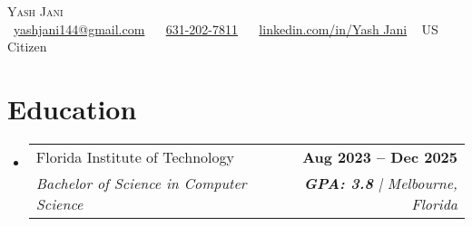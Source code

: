 \documentclass[letterpaper,11pt]{article}
\makeatletter
\newcommand{\resumeSubheading}[4]{
  \vspace{-2pt}\item
    \begin{tabular*}{1.0\textwidth}[t]{l@{\extracolsep{\fill}}r}
      \small#1 & \textbf{\small #2} \\
      \textit{\small#3} & \textit{\small #4} \\
    \end{tabular*}\vspace{-9pt}
}
\newcommand{\resumeSubHeadingListStart}{\begin{itemize}[leftmargin=0.0in, label={}]}
\newcommand{\resumeSubHeadingListEnd}{\end{itemize}}
\makeatother
\begin{document}
\begin{center}
    {\Huge \scshape Yash Jani} \\ \vspace{1pt}
    \small
    \raisebox{-0.2\height}{\faEnvelope}~\href{mailto:yashjani144@gmail.com}{yashjani144@gmail.com} ~
    \raisebox{-0.1\height}{\faPhone}~\href{tel:6312027811}{631-202-7811} ~
    \raisebox{-0.2\height}{\faLinkedin}~\href{https://www.linkedin.com/in/yash-jani-8245bb26a/}{linkedin.com/in/Yash Jani} ~
    US Citizen
    \vspace{-10pt}
\end{center}


\section{Education}
  \resumeSubHeadingListStart
    \resumeSubheading      
      {Florida Institute of Technology}{Aug 2023 -- Dec 2025}
      {Bachelor of Science in Computer Science}{\textbf{GPA: 3.8} | Melbourne, Florida}
  \resumeSubHeadingListEnd
  \vspace{-8pt}
  
\end{document}
